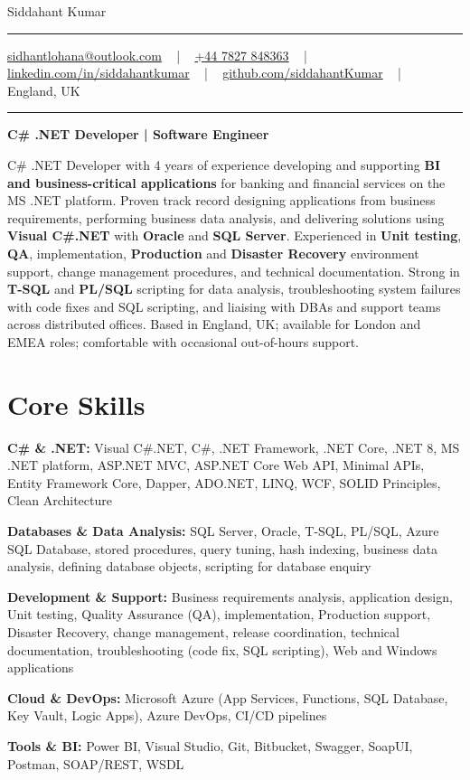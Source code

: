 \documentclass[letterpaper,10pt]{article}
\newcommand{\documentTitle}[2]{
  \begin{center}
    \vspace*{-0.3in}
    {\Huge\color{accentTitle} #1}
    \vspace{8pt}
    {\color{accentLine} \hrule}
    \vspace{2pt}
    \footnotesize{#2}
    \vspace{2pt}
    {\color{accentLine} \hrule}
  \end{center}
}
\newenvironment{resume_list}{
  \vspace{-7pt}
  \begin{itemize}[itemsep=-2px, parsep=1pt, leftmargin=30pt]
}{
  \end{itemize}
}
\begin{document}
\documentTitle{Siddahant Kumar}{
\vspace{0.1cm}
\href{mailto:sidhantlohana@outlook.com}{sidhantlohana@outlook.com} ~ | ~
\href{tel:+447827848363}{+44 7827 848363} ~ | ~
\href{https://www.linkedin.com/in/siddahantkumar/}{linkedin.com/in/siddahantkumar} ~ | ~
\href{https://github.com/siddahantKumar}{github.com/siddahantKumar} ~ | ~
England, UK
}

\begin{center}
\textbf{C\# .NET Developer | Software Engineer}
\end{center}

C\# .NET Developer with 4 years of experience developing and supporting \textbf{BI and business-critical applications} for banking and financial services on the MS .NET platform. Proven track record designing applications from business requirements, performing business data analysis, and delivering solutions using \textbf{Visual C\#.NET} with \textbf{Oracle} and \textbf{SQL Server}. Experienced in \textbf{Unit testing}, \textbf{QA}, implementation, \textbf{Production} and \textbf{Disaster Recovery} environment support, change management procedures, and technical documentation. Strong in \textbf{T-SQL} and \textbf{PL/SQL} scripting for data analysis, troubleshooting system failures with code fixes and SQL scripting, and liaising with DBAs and support teams across distributed offices. Based in England, UK; available for London and EMEA roles; comfortable with occasional out-of-hours support.


\section{Core Skills}

\begin{resume_list}
    \item \textbf{C\# \& .NET:} Visual C\#.NET, C\#, .NET Framework, .NET Core, .NET 8, MS .NET platform, ASP.NET MVC, ASP.NET Core Web API, Minimal APIs, Entity Framework Core, Dapper, ADO.NET, LINQ, WCF, SOLID Principles, Clean Architecture
    \item \textbf{Databases \& Data Analysis:} SQL Server, Oracle, T-SQL, PL/SQL, Azure SQL Database, stored procedures, query tuning, hash indexing, business data analysis, defining database objects, scripting for database enquiry
    \item \textbf{Development \& Support:} Business requirements analysis, application design, Unit testing, Quality Assurance (QA), implementation, Production support, Disaster Recovery, change management, release coordination, technical documentation, troubleshooting (code fix, SQL scripting), Web and Windows applications
    \item \textbf{Cloud \& DevOps:} Microsoft Azure (App Services, Functions, SQL Database, Key Vault, Logic Apps), Azure DevOps, CI/CD pipelines
    \item \textbf{Tools \& BI:} Power BI, Visual Studio, Git, Bitbucket, Swagger, SoapUI, Postman, SOAP/REST, WSDL
\end{resume_list}
\end{document}
